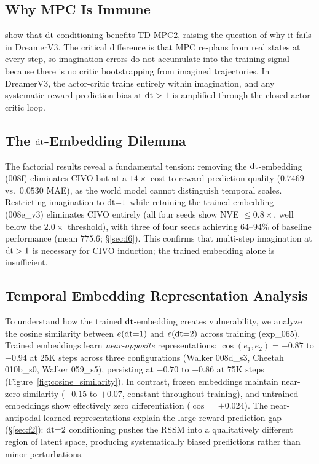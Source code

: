 \subsection{Why MPC Is Immune}
\label{sec:mpc_immune}

\citet{nhu2025tawm} show that $\mathrm{dt}$-conditioning benefits TD-MPC2, raising the question of why it fails in DreamerV3.  The critical difference is that MPC re-plans from real states at every step, so imagination errors do not accumulate into the training signal because there is no critic bootstrapping from imagined trajectories.  In DreamerV3, the actor-critic trains entirely within imagination, and any systematic reward-prediction bias at $\mathrm{dt} > 1$ is amplified through the closed actor-critic loop.

\subsection{The \texorpdfstring{$\mathrm{dt}$}{dt}-Embedding Dilemma}
\label{sec:embedding_dilemma}

The factorial results reveal a fundamental tension: removing the $\mathrm{dt}$-embedding (008f) eliminates CIVO but at a $14\times$ cost to reward prediction quality ($0.7469$ vs.\ $0.0530$ MAE), as the world model cannot distinguish temporal scales.  Restricting imagination to $\mathrm{dt}{=}1$ while retaining the trained embedding (008e\_v3) eliminates CIVO entirely (all four seeds show NVE $\leq 0.8\times$, well below the $2.0\times$ threshold), with three of four seeds achieving $64$--$94\%$ of baseline performance (mean $775.6$; \S\ref{sec:f6}).  This confirms that multi-step imagination at $\mathrm{dt} > 1$ is necessary for CIVO induction; the trained embedding alone is insufficient.

\subsection{Temporal Embedding Representation Analysis}
\label{sec:cosine_evolution}

To understand how the trained $\mathrm{dt}$-embedding creates vulnerability, we analyze the cosine similarity between $e(\mathrm{dt}{=}1)$ and $e(\mathrm{dt}{=}2)$ across training (exp\_065). Trained embeddings learn \emph{near-opposite} representations: $\cos(e_1, e_2) = {-}0.87$ to ${-}0.94$ at 25K steps across three configurations (Walker 008d\_s3, Cheetah 010b\_s0, Walker 059\_s5), persisting at ${-}0.70$ to ${-}0.86$ at 75K steps (Figure~\ref{fig:cosine_similarity}). In contrast, frozen embeddings maintain near-zero similarity ($-0.15$ to $+0.07$, constant throughout training), and untrained embeddings show effectively zero differentiation ($\cos = +0.024$). The near-antipodal learned representations explain the large reward prediction gap (\S\ref{sec:f2}): $\mathrm{dt}{=}2$ conditioning pushes the RSSM into a qualitatively different region of latent space, producing systematically biased predictions rather than minor perturbations.

